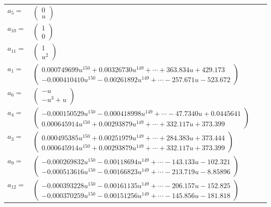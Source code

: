 \documentclass[1p]{elsarticle_modified}
\theoremstyle{definition}
\begin{document}
\begin{tabular}{m{7pt} m{180pt} m{7pt} m{180pt} }
\flushright $a_{5}=$&$\begin{pmatrix}0\\u\end{pmatrix}$ \\
\flushright $a_{10}=$&$\begin{pmatrix}1\\0\end{pmatrix}$ \\
\flushright $a_{11}=$&$\begin{pmatrix}1\\u^2\end{pmatrix}$ \\
\flushright $a_{1}=$&$\begin{pmatrix}0.000749699 u^{150}+0.00326730 u^{149}+\cdots+363.834 u+429.173\\-0.000410410 u^{150}-0.00261892 u^{149}+\cdots-257.671 u-523.672\end{pmatrix}$ \\
\flushright $a_{6}=$&$\begin{pmatrix}- u\\- u^3+u\end{pmatrix}$ \\
\flushright $a_{4}=$&$\begin{pmatrix}-0.000150529 u^{150}-0.000418998 u^{149}+\cdots-47.7340 u+0.0445641\\0.000645914 u^{150}+0.00293879 u^{149}+\cdots+332.117 u+373.399\end{pmatrix}$ \\
\flushright $a_{3}=$&$\begin{pmatrix}0.000495385 u^{150}+0.00251979 u^{149}+\cdots+284.383 u+373.444\\0.000645914 u^{150}+0.00293879 u^{149}+\cdots+332.117 u+373.399\end{pmatrix}$ \\
\flushright $a_{9}=$&$\begin{pmatrix}-0.000269832 u^{150}-0.00118694 u^{149}+\cdots-143.133 u-102.321\\-0.000513616 u^{150}-0.00166823 u^{149}+\cdots-213.719 u-8.85896\end{pmatrix}$ \\
\flushright $a_{12}=$&$\begin{pmatrix}-0.000393228 u^{150}-0.00161135 u^{149}+\cdots-206.157 u-152.825\\-0.000370259 u^{150}-0.00151256 u^{149}+\cdots-145.856 u-181.818\end{pmatrix}$ \\

\end{tabular}
\end{document}
